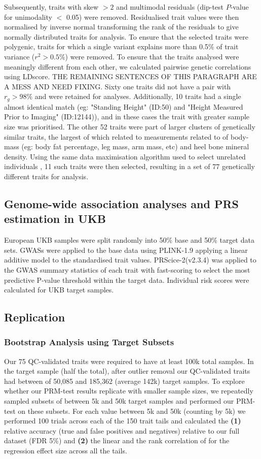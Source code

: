 \documentclass[times]{zHenriquesLab-StyleBioRxiv}
\begin{document}
Subsequently, traits with skew $>2$ and multimodal residuals (dip-test
\citep{dip} $P$-value for unimodality $<$ 0.05) were
removed. Residualised trait values were then normalised by inverse
normal transforming the rank of the residuals to give normally
distributed traits for analysis.  To ensure
that the selected traits were polygenic, traits for which a single
variant explains more than 0.5\% of trait variance
($r^2 > 0.5\%$) were removed.  To ensure that the traits analysed were
meaningly different from each other, we calculated pairwise genetic
correlations using LDscore\cite{ldsc}. THE REMAINING SENTENCES OF THIS
PARAGRAPH ARE A MESS AND NEED FIXING. Sixty one traits did not have a
pair with $r_g>98\%$ and were retained for analyses. Additionally, 10
traits had a single almost identical match (eg: "Standing Height"
(ID:50) and "Height Measured Prior to Imaging" (ID:12144)), and in
these cases the trait with greater sample size was prioritised.  The
other 52 traits were part of larger clusters of genetically similar
traits, the largest of which related to measurements related to of
body-mass (eg: body fat percentage, leg mass, arm mass, etc) and heel
bone mineral density.  Using the same data maximisation algorithm used
to select unrelated individuals \citep{erase}, 11 such traits were
then selected, resulting in a set of 77 genetically different traits
for analysis.

\subsection*{Genome-wide association analyses and PRS estimation in UKB}
European UKB samples were split randomly into 50\% base and 50\%
target data sets. GWASs were applied to the base data using PLINK-1.9
\citep{bt_10} applying a linear additive model to the standardised
trait values. PRScice-2(v2.3.4) \citep{prsice} was applied to the GWAS
summary statistics of each trait with fast-scoring to select the most
predictive P-value threshold within the target data. Individual risk
scores were calculated for UKB target samples.

\subsection*{Replication}
\subsubsection*{Bootstrap Analysis using Target Subsets}
Our 75 QC-validated traits were required to have at least 100k total
samples.  In the target sample (half the total), after outlier removal
our QC-validated traits had between of 50,085 and 185,362 (average
142k) target samples.  To explore whether our PRM-test results
replicate with smaller sample sizes, we repeatedly sampled subsets of
between 5k and 50k target samples and performed our PRM-test on these
subsets.  For each value between 5k and 50k (counting by 5k) we
performed 100 trials across each of the 150 trait tails and calculated
the \textbf{(1)} relative accuracy (true and false positives and
negatives) relative to our full dataset (FDR 5\%) and \textbf{(2)} the
linear and the rank correlation of for the regression effect size
across all the tails.
\end{document}
